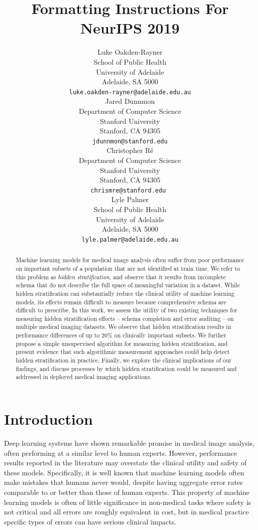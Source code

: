 \documentclass{article}
\title{Formatting Instructions For NeurIPS 2019}
\author{%
  Luke Oakden-Rayner\\
  School of Public Health\\
  University of Adelaide\\
  Adelaide, SA 5000 \\
  \texttt{luke.oakden-rayner@adelaide.edu.au} \\
  \And
    Jared Dunnmon\\
  Department of Computer Science\\
  Stanford University\\
  Stanford, CA 94305 \\
  \texttt{jdunnmon@stanford.edu} \\
  \And
  Christopher R\'{e}\\
  Department of Computer Science\\
  Stanford University\\
  Stanford, CA 94305 \\
  \texttt{chrismre@stanford.edu } \\
  \And
    Lyle Palmer\\
  School of Public Health\\
  University of Adelaide\\
  Adelaide, SA 5000 \\
  \texttt{lyle.palmer@adelaide.edu.au} }
\begin{document}
\maketitle

\begin{abstract}
Machine learning models for medical image analysis often suffer from poor performance on important subsets of a population that are not identified at train time.  
We refer to this problem as \textit{hidden stratification}, and observe that it results from incomplete schema that do not describe the full space of meaningful variation in a dataset.  
While hidden stratification can substantially reduce the clinical utility of machine learning models, its effects remain difficult to measure because comprehensive schema are difficult to prescribe.
In this work, we assess the utility of two existing techniques for measuring hidden stratification effects -- schema completion and error auditing -- on multiple medical imaging datasets.
We observe that hidden stratification results in performance differences of up to 20\% on clinically important subsets.
We further propose a simple unsupervised algorithm for measuring hidden stratification, and present evidence that such algorithmic measurement approaches could help detect hidden stratification in practice.
Finally, we explore the clinical implications of our findings, and discuss processes by which hidden stratification could be measured and addressed in deployed medical imaging applications. 
\end{abstract}

\section{Introduction}

Deep learning systems have shown remarkable promise in medical image analysis, often performing at a similar level to human experts. 
 However, performance results reported in the literature may overstate the clinical utility and safety of these models.  
 Specifically, it is well known that machine learning models often make mistakes that humans never would, despite having aggregate error rates comparable to or better than those of human experts. 
 This property of machine learning models is often of little significance in non-medical tasks where safety is not critical and all errors are roughly equivalent in cost, but in medical practice specific types of errors can have serious clinical impacts. 
 
\end{document}
